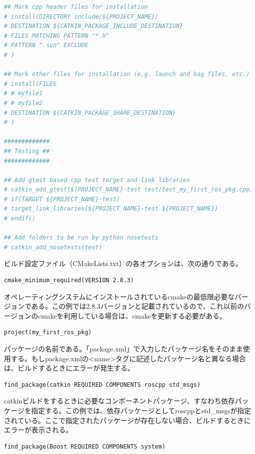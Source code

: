 \begin{lstlisting}[language=make]
## Mark cpp header files for installation
# install(DIRECTORY include/${PROJECT_NAME}/
# DESTINATION ${CATKIN_PACKAGE_INCLUDE_DESTINATION}
# FILES_MATCHING PATTERN "*.h"
# PATTERN ".svn" EXCLUDE
# )

## Mark other files for installation (e.g. launch and bag files, etc.)
# install(FILES
# # myfile1
# # myfile2
# DESTINATION ${CATKIN_PACKAGE_SHARE_DESTINATION}
# )

#############
## Testing ##
#############

## Add gtest based cpp test target and link libraries
# catkin_add_gtest(${PROJECT_NAME}-test test/test_my_first_ros_pkg.cpp)
# if(TARGET ${PROJECT_NAME}-test)
# target_link_libraries(${PROJECT_NAME}-test ${PROJECT_NAME})
# endif()

## Add folders to be run by python nosetests
# catkin_add_nosetests(test)
\end{lstlisting}

ビルド設定ファイル（CMakeLists.txt）の各オプションは、次の通りである。

\begin{lstlisting}[language=make]
cmake_minimum_required(VERSION 2.8.3)
\end{lstlisting}

オペレーティングシステムにインストールされているcmakeの最低限必要なバージョンである。この例では2.8.3バージョンと記載されているので、これ以前のバージョンのcmakeを利用している場合は、cmakeを更新する必要がある。

\begin{lstlisting}[language=make]
project(my_first_ros_pkg)
\end{lstlisting}

パッケージの名前である。「package.xml」で入力したパッケージ名をそのまま使用する。もしpackage.xmlの<name>タグに記述したパッケージ名と異なる場合は、ビルドするときにエラーが発生する。

\begin{lstlisting}[language=make]
find_package(catkin REQUIRED COMPONENTS roscpp std_msgs)
\end{lstlisting}

catkinビルドをするときに必要なコンポーネントパッケージ、すなわち依存パッケージを指定する。この例では、依存パッケージとしてroscppとstd\_msgsが指定されている。ここで指定されたパッケージが存在しない場合、ビルドするときにエラーが表示される。

\begin{lstlisting}[language=make]
find_package(Boost REQUIRED COMPONENTS system)
\end{lstlisting}


